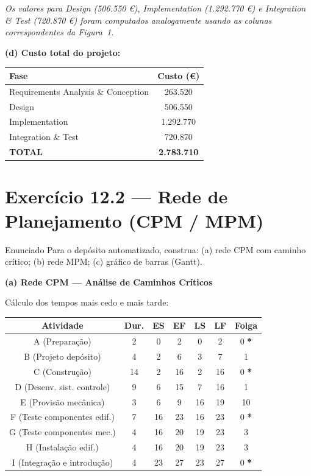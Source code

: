 \documentclass[12pt,a4paper]{article}
\begin{document}
\textit{Os valores para Design (506.550 €), Implementation (1.292.770 €) e
Integration \& Test (720.870 €) foram computados analogamente usando as
colunas correspondentes da Figura~1.}

\textbf{(d) Custo total do projeto:}

\begin{center}
\begin{tabular}{lc}
\toprule
\textbf{Fase} & \textbf{Custo (€)} \\
\midrule
Requirements Analysis \& Conception & 263.520 \\
Design & 506.550 \\
Implementation & 1.292.770 \\
Integration \& Test & 720.870 \\
\midrule
\textbf{TOTAL} & \textbf{2.783.710} \\
\bottomrule
\end{tabular}
\end{center}

\section*{Exercício 12.2 — Rede de Planejamento (CPM / MPM)}

\begin{questao}{Enunciado}
Para o depósito automatizado, construa: (a) rede CPM com caminho crítico;
(b) rede MPM; (c) gráfico de barras (Gantt).
\end{questao}

\textbf{(a) Rede CPM — Análise de Caminhos Críticos}

Cálculo dos tempos mais cedo e mais tarde:

\begin{center}\small
\begin{tabular}{ccccccc}
\toprule
\textbf{Atividade} & \textbf{Dur.} & \textbf{ES} & \textbf{EF} & \textbf{LS} & \textbf{LF} & \textbf{Folga} \\
\midrule
A (Preparação)               & 2  & 0  & 2  & 0  & 2  & 0 \textbf{*} \\
B (Projeto depósito)         & 4  & 2  & 6  & 3  & 7  & 1 \\
C (Construção)               & 14 & 2  & 16 & 2  & 16 & 0 \textbf{*} \\
D (Desenv. sist. controle)   & 9  & 6  & 15 & 7  & 16 & 1 \\
E (Provisão mecânica)        & 3  & 6  & 9  & 16 & 19 & 10 \\
F (Teste componentes edif.)  & 7  & 16 & 23 & 16 & 23 & 0 \textbf{*} \\
G (Teste componentes mec.)   & 4  & 16 & 20 & 19 & 23 & 3 \\
H (Instalação edif.)         & 4  & 16 & 20 & 19 & 23 & 3 \\
I (Integração e introdução)  & 4  & 23 & 27 & 23 & 27 & 0 \textbf{*} \\
\bottomrule
\end{tabular}
\end{center}
\end{document}
